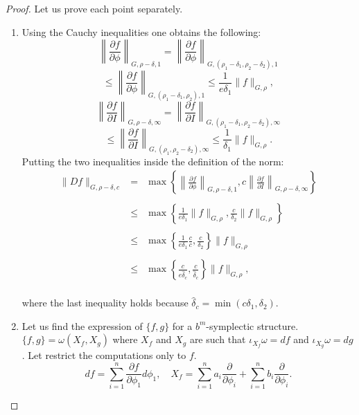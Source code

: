 \begin{proof}
Let us prove each point separately.
\begin{enumerate}
\item %

Using the Cauchy inequalities one obtains the following:
$$\left\|\frac{\partial f}{\partial \phi}\right\|_{G,\rho-\delta,1} = \left\|\frac{\partial f}{\partial \phi}\right\|_{G,(\rho_1-\delta_1, \rho_2- \delta_2), 1} $$
$$\leq \left\|\frac{\partial f}{\partial \phi}\right\|_{G,(\rho_1-\delta_1, \rho_2), 1} \leq \frac{1}{e\delta_1} \|f\|_{G,\rho},$$
$$\left\|\frac{\partial f}{\partial I}\right\|_{G,\rho-\delta,\infty} = \left\|\frac{\partial f}{\partial I}\right\|_{G,(\rho_1-\delta_1, \rho_2- \delta_2), \infty} $$
$$\leq \left\|\frac{\partial f}{\partial I}\right\|_{G,(\rho_1, \rho_2-\delta_2), \infty} \leq \frac{1}{\delta_1} \|f\|_{G,\rho}.$$
Putting the two inequalities inside the definition of the norm:
$$
\begin{array}{rcl}
\|D f\|_{G,\rho-\delta, c} &=& \displaystyle \max\left\{\left\|\frac{\partial f}{\partial \phi}\right\|_{G,\rho-\delta, 1}, c\left\|\frac{\partial f}{\partial I}\right\|_{G, \rho-\delta, \infty}\right\} \\
\\
& \leq & \displaystyle \max \left\{\frac{1}{e \delta_1}\|f\|_{G,\rho}, \frac{c}{\delta_2}\|f\|_{G, \rho}\right\}\\
\\
& \leq & \displaystyle \max \left\{\frac{1}{e\delta_1}\frac{c}{c}, \frac{c}{\delta_2}\right\}\|f\|_{G,\rho}\\
\\
& \leq & \displaystyle \max \left\{\frac{c}{e \hat\delta_c},\frac{c}{\hat\delta_c}\right\}\|f\|_{G,\rho},\\
\end{array}
$$

where the last inequality holds because $\hat\delta_c = \min(c\delta_1,\delta_2)$.

\item
Let us find the expression of $\{f,g\}$ for a $b^m$-symplectic structure.
$\{f,g\} = \omega(X_f, X_g)$ where $X_f$ and $X_g$ are such that $\iota_{X_f}\omega=df$ and $\iota_{X_g}\omega=dg$. Let restrict the computations only to $f$.
$$df = \sum_{i=1}^n\frac{\partial f}{\partial \phi_1}d\phi_1, \quad X_f = \sum_{i= 1}^n a_i \frac{\partial}{\partial \phi_i} + \sum_{i=1}^n b_i \frac{\partial}{\partial \phi_i}.$$


\end{enumerate}
\end{proof}
